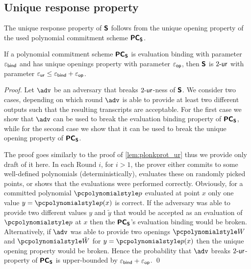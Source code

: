 \documentclass[runningheads,11pt]{llncs}
\begin{document}
\subsection{Unique response property}
The unique response property of $\bm{\mathsf{S}}$ follows from the unique opening
property of the used polynomial commitment scheme $\bm{\mathsf{PC}}_{\bm{\mathsf{S}}}$.
\begin{lemma}
\label{lem:sonicprot_ur}
If a polynomial commitment scheme $\bm{\mathsf{PC}}_{\bm{\mathsf{S}}}$ is evaluation binding with
parameter $\varepsilon_{\mathsf{bind}}$ and has unique openings property with parameter
$\varepsilon_{\mathsf{op}}$, then $\bm{\mathsf{S}}$ is ${2\text{-}\mathsf{ur}}$ with parameter $\varepsilon_{\mathsf{ur}} \leq
\varepsilon_{\mathsf{bind}} + \varepsilon_{\mathsf{op}}$.  
\end{lemma}
\begin{proof}
  Let $\adv$ be an adversary that breaks ${2\text{-}\mathsf{ur}}$-ness of $\bm{\mathsf{S}}$.  We
  consider two cases, depending on which round $\adv$ is able to provide at
  least two different outputs such that the resulting transcripts are
  acceptable.  For the first case we show that $\adv$ can be used to break the
  evaluation binding property of $\bm{\mathsf{PC}}_{\bm{\mathsf{S}}}$, while for the second case we show
  that it can be used to break the unique opening property of $\bm{\mathsf{PC}}_{\bm{\mathsf{S}}}$.

  The proof goes similarly to the proof of \cref{lem:plonkprot_ur} thus we
  provide only draft of it here.  In each Round $i$, for $i > 1$, the prover
  either commits to some well-defined polynomials (deterministically), evaluates
  these on randomly picked points, or shows that the evaluations were performed
  correctly.  Obviously, for a committed polynomial $\p{p}$ evaluated at point
  $x$ only one value $y = \p{p}(x)$ is correct. If the adversary was able to
  provide two different values $y$ and $\tilde{y}$ that would be accepted as an
  evaluation of $\p{p}$ at $x$ then the $\bm{\mathsf{PC}}_{\bm{\mathsf{S}}}$'s evaluation binding would be
  broken.  Alternatively, if $\adv$ was able to provide two openings $\p{W}$ and
  $\p{\tilde{W}}$ for $y = \p{p}(x)$ then the unique opening property would be
  broken.
%
Hence the probability that $\adv$ breaks ${2\text{-}\mathsf{ur}}$-property of $\bm{\mathsf{PC}}_{\bm{\mathsf{S}}}$ is
upper-bounded by $\varepsilon_{\mathsf{bind}} + \varepsilon_{\mathsf{op}}$. 
\qed

\end{proof}
\end{document}
